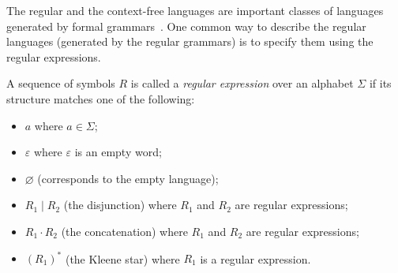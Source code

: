 The regular and the context-free languages are important classes of languages generated by formal grammars~\cite{aho1973theory}. One common way to describe the regular languages (generated by the regular grammars) is to specify them using the regular expressions.

\begin{definition}
A sequence of symbols $R$ is called a \textit{regular expression} over an alphabet $\Sigma$ if its structure matches one of the following:
\begin{itemize}
    \item $a$ where $a \in \Sigma$;
    \item $\varepsilon$ where $\varepsilon$ is an empty word;
    \item $\varnothing$ (corresponds to the empty language);
    \item $R_1 \mid R_2$ (the disjunction) where $R_1$ and $R_2$ are regular expressions;
    \item $R_1 \cdot R_2$ (the concatenation) where $R_1$ and $R_2$ are regular expressions;
    \item $(R_1)^*$ (the Kleene star) where $R_1$ is a regular expression.
\end{itemize}
\end{definition}

